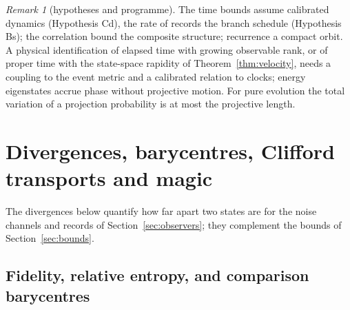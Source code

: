 \documentclass[aps,pra,onecolumn,superscriptaddress,nofootinbib,10pt]{revtex4-2}
\theoremstyle{definition}
\theoremstyle{remark}
\newtheorem{remark}[theorem]{Remark}
\begin{document}
\begin{remark}[hypotheses and programme]\label{rem:bdprogramme}
The time bounds assume calibrated dynamics (Hypothesis Cd), the rate of records the branch schedule
(Hypothesis Bs); the correlation bound the composite structure; recurrence a compact orbit.  A physical
identification of elapsed time with growing observable rank, or of proper time with the state-space
rapidity of Theorem~\ref{thm:velocity}, needs a coupling to the event metric and a calibrated relation to
clocks; energy eigenstates accrue phase without projective motion.  For pure evolution the total
variation of a projection probability is at most the projective length.
\end{remark}



\section{Divergences, barycentres, Clifford transports and magic}\label{sec:divergences}

The divergences below quantify how far apart two states are for the noise channels and records of
Section~\ref{sec:observers}; they complement the bounds of Section~\ref{sec:bounds}.

\subsection{Fidelity, relative entropy, and comparison barycentres}\label{ob:divergences}
\end{document}

